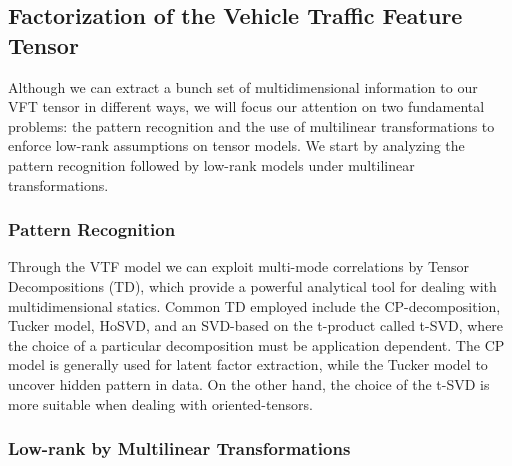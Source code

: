 \documentclass[sensors,article,submit,moreauthors,pdftex]{Definitions/mdpi}
\newcommand{\mathten}[1]{\boldsymbol{\mathbf{\mathcal{\MakeUppercase{#1}}}}}
\begin{document}

\subsection{Factorization of the Vehicle Traffic Feature Tensor}
Although we can extract a bunch set of multidimensional information to our VFT tensor in different ways, we will focus our attention on two fundamental problems: the pattern recognition and the use of multilinear transformations to enforce low-rank assumptions on tensor models. We start by analyzing the pattern recognition followed by low-rank models under multilinear transformations.

\subsubsection{Pattern Recognition}
Through the VTF model we can exploit multi-mode correlations by Tensor Decompositions (TD), which provide a powerful analytical tool for dealing with multidimensional statics. Common TD employed include the CP-decomposition, Tucker model, HoSVD, and an SVD-based on the t-product called t-SVD, where the choice of a particular decomposition must be application dependent. The CP model is generally used for latent factor extraction, while the Tucker model to uncover hidden pattern in data. On the other hand, the choice of the t-SVD is more suitable when dealing with oriented-tensors.

\subsubsection{Low-rank by Multilinear Transformations}
\end{document}
